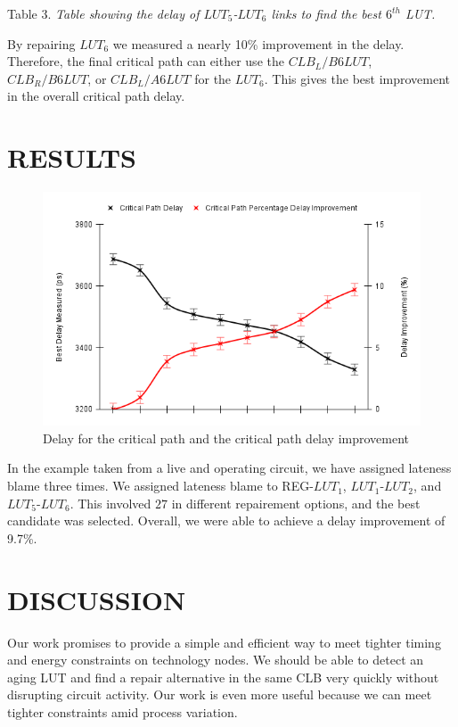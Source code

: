 \documentclass[11pt]{report}
\begin{document}
\begin{mainf}
 Table 3. \textit{Table showing the delay of $LUT_5$-$LUT_6$ links to find the best $6^{th}$ LUT. }

By repairing $LUT_6$ we measured a nearly 10\% improvement in the delay. Therefore, the final critical path can either use the $CLB_L/B6LUT$, $CLB_R/B6LUT$, or $CLB_L/A6LUT$ for the $LUT_6$. This gives the best improvement in the overall critical path delay. 


\section{\textbf{RESULTS}}

\begin{figure}[H]
    \centering
    \includegraphics[width=0.75\linewidth]{delay_percent.png}
    \caption{Delay for the critical path and the critical path delay improvement}
    \label{fig:enter-label}
\end{figure}

In the example taken from a live and operating circuit, we have assigned lateness blame three times. We assigned lateness blame to REG-$LUT_1$, $LUT_1$-$LUT_2$, and $LUT_5$-$LUT_6$. This involved $27$ in different repairement options, and the best candidate was selected. Overall, we were able to achieve a delay improvement of 9.7\%. 

\section{\textbf{DISCUSSION}}
Our work promises to provide a simple and efficient way to meet tighter timing and energy constraints on technology nodes. We should be able to detect an aging LUT and find a repair alternative in the same CLB  very quickly without disrupting circuit activity. Our work is even more useful because we can meet tighter constraints amid process variation. 



\end{mainf}
\end{document}
